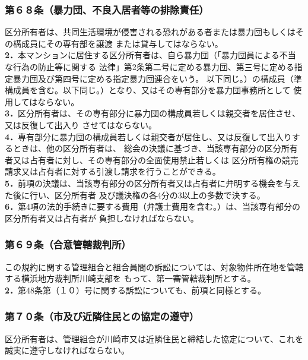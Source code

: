 \documentclass[
  luatex,
  paper=a4paper,
  fontsize=11pt,
  jafontsize=11pt,
  jlreq_notes,
]{jlreq}
\begin{document}
  \subsubsection*{第６８条（暴力団、不良入居者等の排除責任）}
  区分所有者は、共同生活環境が侵害される恐れがある者または暴力団もしくはその構成員にその専有部を譲渡
  または貸与してはならない。\\
  \textbf{2．}本マンションに居住する区分所有者は、自ら暴力団（「暴力団員による不当な行為の防止等に関する
  法律」第2条第二号に定める暴力団、第三号に定める指定暴力団及び第四号に定める指定暴力団連合をいう。
  以下同じ。）の構成員（準構成員を含む。以下同じ。）となり、又はその専有部分を暴力団事務所として
  使用してはならない。\\
  \textbf{3．}区分所有者は、その専有部分に暴力団の構成員若しくは親交者を居住させ、又は反復して出入り
  させてはならない。\\
  \textbf{4．}専有部分に暴力団の構成員若しくは親交者が居住し、又は反復して出入りするときは、他の区分所有者は、
  総会の決議に基づき、当該専有部分の区分所有者又は占有者に対し、その専有部分の全面使用禁止若しくは
  区分所有権の競売請求又は占有者に対する引渡し請求を行うことができる。\\
  \textbf{5．}前項の決議は、当該専有部分の区分所有者又は占有者に弁明する機会を与えた後に行い、区分所有者
  及び議決権の各4分の3以上の多数で決する。\\
  \textbf{6．}第4項の法的手続きに要する費用（弁護士費用を含む。）は、当該専有部分の区分所有者又は占有者が
  負担しなければならない。
  \subsubsection*{第６９条（合意管轄裁判所）}
  この規約に関する管理組合と組合員間の訴訟については、対象物件所在地を管轄する横浜地方裁判所川崎支部を
  もって、第一審管轄裁判所とする。\\
  \textbf{2．}第48条第（１０）号に関する訴訟についても、前項と同様とする。
  \subsubsection*{第７０条（市及び近隣住民との協定の遵守）}
  区分所有者は、管理組合が川崎市又は近隣住民と締結した協定について、これを誠実に遵守しなければならない。
\end{document}
